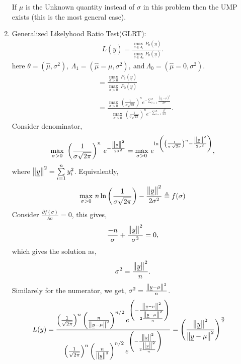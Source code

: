 \documentclass[a4paper,english,12pt]{article}
\begin{document}
\begin{enumerate}[label=(\alph*).]
\begin{note}
If $\mu$ is the Unknown quantity instead of $\sigma$ in this problem then the UMP exists (this is the most general case).
\end{note}
\item Generalized Likelyhood Ratio Test(GLRT):
\begin{align*}
L(\underline{y})=\frac{\underset{\theta \in \Lambda_1}{\max} P_\theta \left( \underline{y} \right)}{\underset{\theta \in \Lambda_0}{\max} P_\theta \left( \underline{y} \right)}.
\end{align*}
here $\theta = (\hat{\mu},\sigma^2),~\Lambda_1 =(\hat{\mu}=\mu,\sigma^2),~\mbox{and}~\Lambda_0 = (\hat{\mu}=0,\sigma^2)$.\\
\begin{align*}
&=\frac{\underset{\sigma >0}{\max}~P_1(\underline{y})}{\underset{\sigma >0}{\max}~P_0(\underline{y})}\\
&=\frac{\underset{\sigma >0}{\max}~\left(\frac{1}{\sigma \sqrt{2\pi}}\right)^n e^{- \sum \limits_{i=1}^n \frac{(y_i-\mu)^2}{2\sigma^2}}}{\underset{\sigma >0}{\max}~\left(\frac{1}{\sigma \sqrt{2\pi}}\right)^n e^{- \sum \limits_{i=1}^n\frac{y_i^2}{2\sigma^2}}}.
\end{align*}
Consider denominator,
\begin{equation*}
\underset{\sigma >0}{\max}~\left(\frac{1}{\sigma \sqrt{2\pi}}\right)^n \, e^{-\frac{ \left\lVert\underline{y}\right\rVert^2}{2 \sigma^2}}=\underset{\sigma >0}{\max}~e^{\ln\left(\left(\frac{1}{\sigma\, \sqrt{2 \pi}}\right)^n - \frac{\left\lVert\underline{y}\right\rVert^2}{2\sigma^2}\right)},
\end{equation*}
where $\left\lVert\underline{y}\right\rVert^2=\sum \limits_{i=1}^n y_i^2$. Equivalently,
\begin{equation*}
\underset{\sigma >0}{\max}~n\ln\left(\frac{1}{\sigma \sqrt{2 \pi}}\right)-\frac{\left\lVert\underline{y}\right\rVert^2}{2\sigma^2}\triangleq f(\sigma)
\end{equation*}
Consider $\frac{\partial f(\sigma)}{\partial \sigma}=0$, this gives,
\begin{equation*}
\frac{-n}{\sigma }+\frac{\left\lVert\underline{y}\right\rVert^2}{\sigma^3}=0,
\end{equation*}
which gives the solution as,
\begin{equation*}
\sigma^2 = \frac{\left\lVert\underline{y}\right\rVert^2}{n}.
\end{equation*}
Similarely for the numerator, we get, $\sigma^2=\frac{\left\lVert\underline{y}-\mu\right\rVert^2}{n}$.
\begin{align*}
L(y)&=\frac{\left(\frac{1}{\sqrt{2\pi}}\right)^n \left(\frac{n}{\norm{\underline{y}-\mu}^2}\right)^{n/2}e^{\left(-\frac{ \norm{\underline{y}-\mu}^2}{2 \frac{\norm{\underline{y}-\mu}^2}{n}} \right)}}{\left(\frac{1}{\sqrt{2\pi}}\right)^n \left(\frac{n}{\norm{\underline{y}}^2}\right)^{n/2}e^{\left(-\frac{ \norm{\underline{y}}^2}{2 \frac{\norm{\underline{y}}^2}{n}} \right)}}=\left(\frac{\norm{\underline{y}}^2}{\norm{\underline{y}-\mu}^2}\right)^{\frac{n}{2}}

\end{align*}
\end{enumerate}
\end{document}
